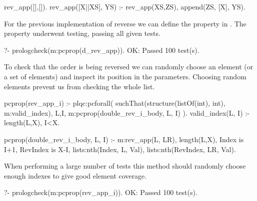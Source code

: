 \documentclass[11pt,twoside]{article}
\begin{document}
\begin{yapcode}
 rev_app([],[]).
 rev_app([X||XS], YS) :- rev_app(XS,ZS), append(ZS, [X], YS).
\end{yapcode}


For the previous implementation of reverse we can define the 
property in .
%
The property underwent testing, passing all given tests.
%
\begin{yapcode}
   ?- prologcheck(m:pcprop(d_rev_app)).
 OK: Passed 100 test(s).
\end{yapcode}
%


To check that the order is being reversed we can randomly choose an
element (or a %
 set of elements) and inspect
 its position in the parameters.
%
Choosing random elements prevent us from checking the whole list.
%
\begin{yapcode}
 pcprop(rev_app_i) :- plqc:pcforall(
     suchThat(structure({listOf(int), int}), m:valid_index),
     {L,I}, m:pcprop({double_rev_i_body, L, I}) ).
 valid_index({L, I}) :- length(L,X), I<X.

 pcprop({double_rev_i_body, L, I}) :- 
   m:rev_app(L, LR), length(L,X), Index is I+1, RevIndex is X-I,
   lists:nth(Index, L, Val), lists:nth(RevIndex, LR, Val).
\end{yapcode}
%
When performing a large number of tests this method should
 randomly choose enough indexes to 
give good
element coverage.
%
\begin{yapcode}
   ?- prologcheck(m:pcprop(rev_app_i)).
 OK: Passed 100 test(s).
\end{yapcode}
\end{document}
